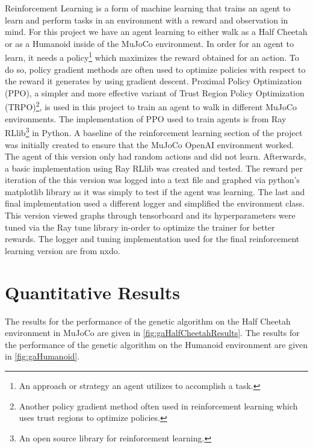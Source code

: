 \documentclass{article}
\begin{document}
    Reinforcement Learning is a form of machine learning that trains an agent to learn and perform tasks in an environment with a reward and observation in mind. For this project we have an agent learning to either walk as a Half Cheetah or as a Humanoid inside of the MuJoCo environment. In order for an agent to learn, it needs a policy\footnote{An approach or strategy an agent utilizes to accomplish a task.} which maximizes the reward obtained for an action. To do so, policy gradient methods are often used to optimize policies with respect to the reward it generates by using gradient descent. Proximal Policy Optimization (PPO), a simpler and more effective variant of Trust Region Policy Optimization (TRPO)\footnote{Another policy gradient method often used in reinforcement learning which uses trust regions to optimize policies.}, is used in this project to train an agent to walk in different MuJoCo environments. The implementation of PPO used to train agents is from Ray RLlib\footnote{An open source library for reinforcement learning.} in Python.
    \newline
    \indent A baseline of the reinforcement learning section of the project was initially created to ensure that the MuJoCo OpenAI environment worked. The agent of this version only had random actions and did not learn. Afterwards, a basic implementation using Ray RLlib was created and tested. The reward per iteration of the this version was logged into a text file and graphed via python's matplotlib library as it was simply to test if the agent was learning. The last and final implementation used a different logger and simplified the environment class. This version viewed graphs through tensorboard and its hyperparameters were tuned via the Ray tune library in-order to optimize the trainer for better rewards. The logger and tuning implementation used for the final reinforcement learning version are from nxdo\cite{nxdo}.

\section{Quantitative Results}

The results for the performance of the genetic algorithm on the Half Cheetah environment in MuJoCo are given in \autoref{fig:gaHalfCheetahResults}.
The results for the performance of the genetic algorithm on the Humanoid environment are given in \autoref{fig:gaHumanoid}.
\end{document}
